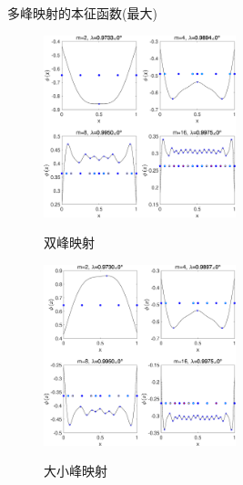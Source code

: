 \documentclass{beamer}
\begin{document}
	\begin{frame}{多峰映射的本征函数(最大)}
		\begin{figure}
			\begin{minipage}{0.45\linewidth}
				\centerline{\includegraphics[width=2.2in]{images/07a-Tents51_eigen_Gauss_n1000_m2-4-8-16_d0.eps}}
				\centerline{双峰映射}
			\end{minipage}
			\hfill
			\begin{minipage}{0.45\linewidth}
				\centerline{\includegraphics[width=2.2in]{images/07b-Tents5l1_eigen_Gauss_n1000_m2-4-8-16_d0.eps}}
				\centerline{大小峰映射}
			\end{minipage}
		\end{figure}
	\end{frame}
\end{document}
